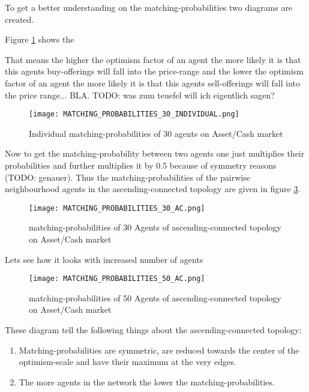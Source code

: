 \documentclass[Bachelorarbeit.tex]{subfiles}
\begin{document}
To get a better understanding on the matching-probabilities two diagrams are created.

Figure \ref{fig:MATCHING_PROBABILITIES_INDIVIDUAL} shows the 

That means the higher the optimism factor of an agent the more likely it is that this agents buy-offerings will fall into the price-range and the lower the optimism factor of an agent the more likely it is that this agents sell-offerings will fall into the price range... BLA. TODO: was zum teuefel will ich eigentlich sagen?

\begin{figure}[H]
	\centering
  \texttt{[image: MATCHING\_PROBABILITIES\_30\_INDIVIDUAL.png]}
	\caption{Individual matching-probabilities of 30 agents on Asset/Cash market}
	\label{fig:MATCHING_PROBABILITIES_INDIVIDUAL}
\end{figure}

Now to get the matching-probability between two agents one just multiplies their probabilities and further multiplies it by 0.5 because of symmetry reasons (TODO: genauer). Thus the matching-probabilities of the pairwise neighbourhood agents in the ascending-connected topology are given in figure \ref{fig:MATCHING_PROBABILITIES_AC}.

\begin{figure}[H]
	\centering
  \texttt{[image: MATCHING\_PROBABILITIES\_30\_AC.png]}
	\caption{matching-probabilities of 30 Agents of ascending-connected topology on Asset/Cash market}
	\label{fig:MATCHING_PROBABILITIES_AC}
\end{figure}

Lets see how it looks with increased number of agents

\begin{figure}[H]
	\centering
  \texttt{[image: MATCHING\_PROBABILITIES\_50\_AC.png]}
	\caption{matching-probabilities of 50 Agents of ascending-connected topology on Asset/Cash market}
	\label{fig:MATCHING_PROBABILITIES_AC}
\end{figure}

These diagram tell the following things about the ascending-connected topology:
\begin{enumerate}
\item Matching-probabilities are symmetric, are reduced towards the center of the optimism-scale and have their maximum at the very edges.
\item The more agents in the network the lower the matching-probabilities.
\end{enumerate}
\end{document}
